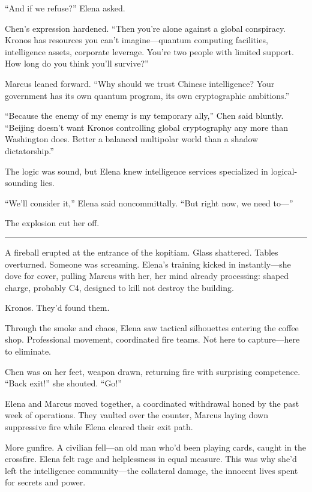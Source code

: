 ``And if we refuse?'' Elena asked.

Chen's expression hardened. ``Then you're alone against a global conspiracy. Kronos has resources you can't imagine---quantum computing facilities, intelligence assets, corporate leverage. You're two people with limited support. How long do you think you'll survive?''

Marcus leaned forward. ``Why should we trust Chinese intelligence? Your government has its own quantum program, its own cryptographic ambitions.''

``Because the enemy of my enemy is my temporary ally,'' Chen said bluntly. ``Beijing doesn't want Kronos controlling global cryptography any more than Washington does. Better a balanced multipolar world than a shadow dictatorship.''

The logic was sound, but Elena knew intelligence services specialized in logical-sounding lies.

``We'll consider it,'' Elena said noncommittally. ``But right now, we need to---''

The explosion cut her off.

\begin{center}\rule{0.5\linewidth}{0.5pt}\end{center}

A fireball erupted at the entrance of the kopitiam. Glass shattered. Tables overturned. Someone was screaming. Elena's training kicked in instantly---she dove for cover, pulling Marcus with her, her mind already processing: shaped charge, probably C4, designed to kill not destroy the building.

Kronos. They'd found them.

Through the smoke and chaos, Elena saw tactical silhouettes entering the coffee shop. Professional movement, coordinated fire teams. Not here to capture---here to eliminate.

Chen was on her feet, weapon drawn, returning fire with surprising competence. ``Back exit!'' she shouted. ``Go!''

Elena and Marcus moved together, a coordinated withdrawal honed by the past week of operations. They vaulted over the counter, Marcus laying down suppressive fire while Elena cleared their exit path.

More gunfire. A civilian fell---an old man who'd been playing cards, caught in the crossfire. Elena felt rage and helplessness in equal measure. This was why she'd left the intelligence community---the collateral damage, the innocent lives spent for secrets and power.


